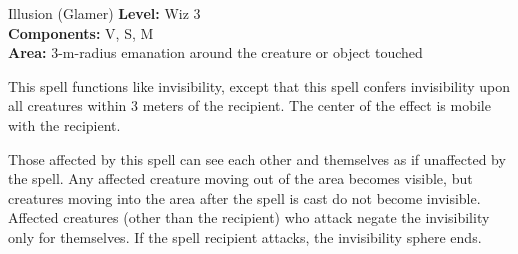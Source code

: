 {Illusion (Glamer)}
{
	\textbf{Level:}
	Wiz 3\\
	\textbf{Components:}
	V, S, M\\
	\textbf{Area:}
	3-m-radius emanation around the creature or object touched\\
}
{
	This spell functions like invisibility, except that this spell confers invisibility upon all creatures within 3 meters of the recipient. The center of the effect is mobile with the recipient.

	Those affected by this spell can see each other and themselves as if unaffected by the spell. Any affected creature moving out of the area becomes visible, but creatures moving into the area after the spell is cast do not become invisible. Affected creatures (other than the recipient) who attack negate the invisibility only for themselves. If the spell recipient attacks, the invisibility sphere ends.

}
